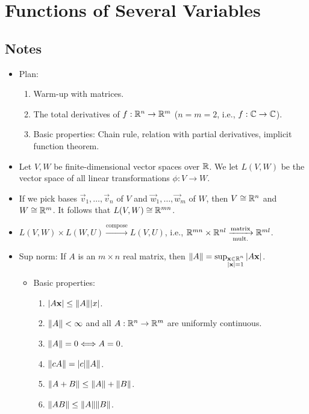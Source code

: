 \documentclass[../notes.tex]{subfiles}
\begin{document}
\chapter{Functions of Several Variables}
\section{Notes}
\begin{itemize}
    \item {}Plan:
    \begin{enumerate}
        \item Warm-up with matrices.
        \item The total derivatives of $f:\mathbb{R}^n\to\mathbb{R}^m$ ($n=m=2$, i.e., $f:\mathbb{C}\to\mathbb{C}$).
        \item Basic properties: Chain rule, relation with partial derivatives, implicit function theorem.
    \end{enumerate}
    \item Let $V,W$ be finite-dimensional vector spaces over $\mathbb{R}$. We let $L(V,W)$ be the vector space of all linear transformations $\phi:V\to W$.
    \item If we pick bases $\vec{v}_1,\dots,\vec{v}_n$ of $V$ and $\vec{w}_1,\dots,\vec{w}_m$ of $W$, then $V\cong\mathbb{R}^n$ and $W\cong\mathbb{R}^m$. It follows that $L(V,W)\cong\mathbb{R}^{mn}$.
    \item $L(V,W)\times L(W,U)\xrightarrow{\text{compose}}L(V,U)$, i.e., $\mathbb{R}^{mn}\times\mathbb{R}^{nl}\xrightarrow[\text{mult.}]{\text{matrix}}\mathbb{R}^{ml}$.
    \item Sup norm: If $A$ is an $m\times n$ real matrix, then $\norm{A}=\sup_{\substack{\mathbf{x}\in\mathbb{R}^n\\|\mathbf{x}|=1}}|A\mathbf{x}|$.
    \begin{itemize}
        \item Basic properties:
        \begin{enumerate}
            \item $|A\mathbf{x}|\leq\norm{A}|x|$.
            \item $\norm{A}<\infty$ and all $A:\mathbb{R}^n\to\mathbb{R}^m$ are uniformly continuous.
            \item $\norm{A}=0\Longleftrightarrow A=0$.
            \item $\norm{cA}=|c|\norm{A}$.
            \item $\norm{A+B}\leq\norm{A}+\norm{B}$.
            \item $\norm{AB}\leq\norm{A}\norm{B}$.
        \end{enumerate}

\end{itemize}
\end{itemize}
\end{document}
